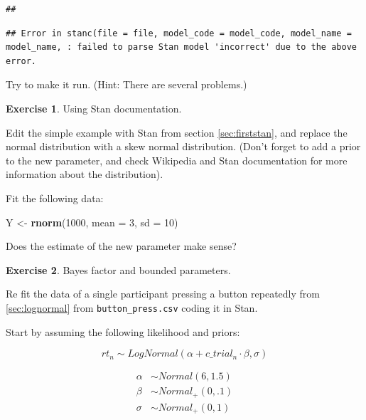 \documentclass[12pt,]{krantz}
\newenvironment{Shaded}{\begin{snugshade}}{\end{snugshade}}
\newcommand{\KeywordTok}[1]{\textcolor[rgb]{0.13,0.29,0.53}{\textbf{#1}}}
\newcommand{\DataTypeTok}[1]{\textcolor[rgb]{0.13,0.29,0.53}{#1}}
\newcommand{\DecValTok}[1]{\textcolor[rgb]{0.00,0.00,0.81}{#1}}
\newcommand{\StringTok}[1]{\textcolor[rgb]{0.31,0.60,0.02}{#1}}
\newcommand{\NormalTok}[1]{#1}
\theoremstyle{definition}
\theoremstyle{definition}
\theoremstyle{definition}
\newtheorem{exercise}{Exercise}[chapter]
\theoremstyle{remark}
\begin{document}
\begin{verbatim}
## 
\end{verbatim}

\begin{verbatim}
## Error in stanc(file = file, model_code = model_code, model_name = model_name, : failed to parse Stan model 'incorrect' due to the above error.
\end{verbatim}

Try to make it run. (Hint: There are several problems.)

\begin{exercise}
\protect\hypertarget{exr:skewstan}{}{\label{exr:skewstan} }Using Stan
documentation. \end{exercise}

Edit the simple example with Stan from section \ref{sec:firststan}, and
replace the normal distribution with a skew normal distribution. (Don't
forget to add a prior to the new parameter, and check Wikipedia and Stan
documentation for more information about the distribution).

Fit the following data:

\begin{Shaded}
\begin{Highlighting}[]
\NormalTok{Y <-}\StringTok{ }\KeywordTok{rnorm}\NormalTok{(}\DecValTok{1000}\NormalTok{, }\DataTypeTok{mean =} \DecValTok{3}\NormalTok{, }\DataTypeTok{sd =} \DecValTok{10}\NormalTok{)}
\end{Highlighting}
\end{Shaded}

Does the estimate of the new parameter make sense?

\begin{exercise}
\protect\hypertarget{exr:lognstan}{}{\label{exr:lognstan} }Bayes factor and
bounded parameters. \end{exercise}

Re fit the data of a single participant pressing a button repeatedly
from \ref{sec:lognormal} from \texttt{button\_press.csv} coding it in
Stan.

Start by assuming the following likelihood and priors:

\begin{equation}
rt_n \sim LogNormal(\alpha + c\_trial_n \cdot \beta,\sigma)
\end{equation}

\begin{equation}
\begin{aligned}
\alpha &\sim Normal(6, 1.5) \\
\beta &\sim Normal_+(0, .1)\\
\sigma &\sim Normal_+(0, 1)
\end{aligned}
\end{equation}
\end{document}
